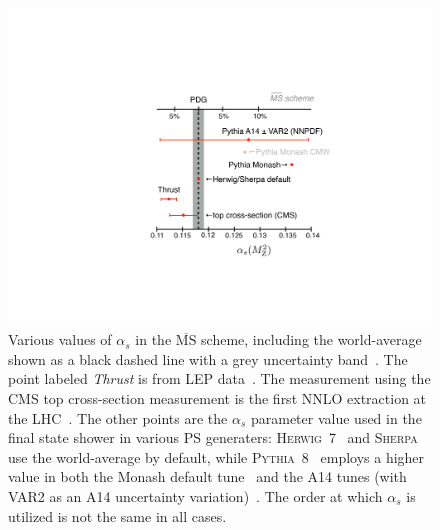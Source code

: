 \documentclass[11pt]{cernrep}
\begin{document}
\begin{figure}[t]
\begin{center}
\includegraphics[width = 0.6\columnwidth]{jetsub_alphas_alphas_propaganda.pdf}
\end{center}
\caption{Various values of $\alpha_s$ in the $\overline{\mathrm{MS}}$ scheme, including the world-average shown as a black dashed line with a grey uncertainty band~\cite{Olive:2016xmw}.
%
The point labeled \textit{Thrust} is from LEP data~\cite{Abbate:2010xh,Hoang:2015hka,Heister:2003aj,Abdallah:2004xe,Abreu:1996mk,Abreu:1999rc,Biebel:1999zt,Adeva:1992gv,Abbiendi:2004qz,Abe:1994mf}.
%
The measurement using the CMS top cross-section measurement is the first NNLO extraction at the LHC~\cite{Chatrchyan:2013haa}.
%
The other points are the $\alpha_s$ parameter value used in the final state shower in various PS generaters: \textsc{Herwig~7}~\cite{Bellm:2015jjp} and \textsc{Sherpa}~\cite{Gleisberg:2008ta} use the world-average by default, while \textsc{Pythia~8}~\cite{Sjostrand:2006za,Sjostrand:2014zea} employs a higher value in both the Monash default tune~\cite{Skands:2014pea} and the A14 tunes (with VAR2 as an A14 uncertainty variation)~\cite{ATL-PHYS-PUB-2014-021}.
%
The order at which $\alpha_s$ is utilized is not the same in all cases.}
\label{jetsub_alphas_jetsub_alphas_fig:propaganda}
\end{figure}
\end{document}
